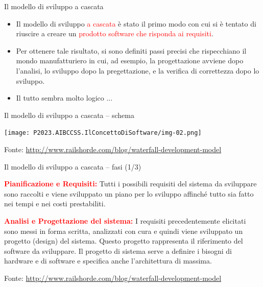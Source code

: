 \documentclass{beamer}
\begin{document}
\begin{frame}{\centerline{Il modello di sviluppo a cascata}}


\begin{itemize}
    \item Il modello di sviluppo \textcolor{red}{a cascata} \`{e} stato il primo modo con cui si \`{e} tentato di riuscire a creare un \textcolor{red}{prodotto software che risponda ai requisiti}.
    \item Per ottenere tale risultato, si sono definiti passi precisi che rispecchiano il mondo manufatturiero in cui, ad esempio, la progettazione avviene dopo l'analisi, lo sviluppo dopo la pregettazione, e la verifica di correttezza dopo lo sviluppo.
\item Il tutto sembra molto logico ...
\end{itemize}


\end{frame}

\begin{frame}{\centerline{Il modello di sviluppo a cascata -- schema}}


\begin{center}
\texttt{[image: P2023.AIBCCSS.IlConcettoDiSoftware/img-02.png]}
\end{center}
\vspace{0.5cm}

\begin{center}
\tiny
Fonte: \url{http://www.railshorde.com/blog/waterfall-development-model}

\end{center}
\end{frame}

\begin{frame}{\centerline{Il modello di sviluppo a cascata -- fasi (1/3)}}


\textcolor{red}{\bf Pianificazione e Requisiti:} Tutti i possibili requisiti del sistema da sviluppare sono raccolti e viene sviluppato un piano per lo sviluppo affinch\'{e} tutto sia fatto nei tempi e nei costi prestabiliti.
\newline

\textcolor{red}{\bf Analisi e Progettazione del sistema:} I requisiti precedentemente elicitati sono messi in forma scritta, analizzati con cura e quindi viene sviluppato un progetto (design) del sistema. Questo progetto rappresenta il riferimento del software da sviluppare. Il progetto di sistema serve a definire i bisogni di hardware e di software e specifica anche l'architettura di massima.
\newline

\begin{center}
\tiny
Fonte: \url{http://www.railshorde.com/blog/waterfall-development-model}
\end{center}

\end{frame}
\end{document}
